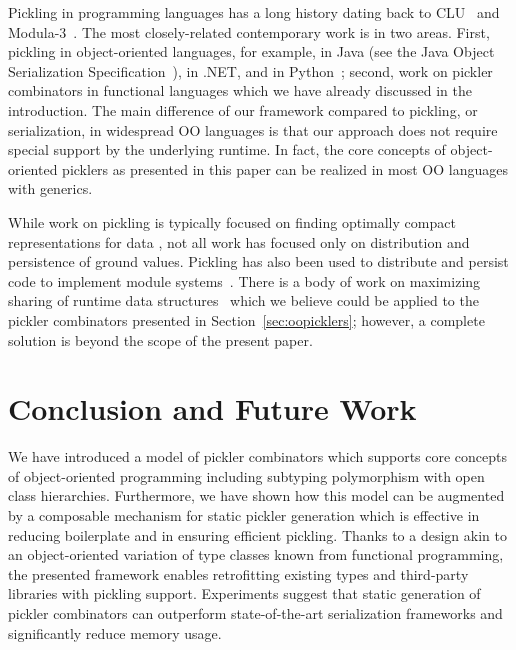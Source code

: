 \documentclass[preprint,10pt]{sigplanconf}
\theoremstyle{definition}
\theoremstyle{definition}
\begin{document}
Pickling in programming languages has a long history dating back to
CLU~\cite{HerlihyL82} and Modula-3~\cite{CardelliDJKN89}. The most
closely-related contemporary work is in two areas. First, pickling in
object-oriented languages, for example, in Java (see the Java Object
Serialization Specification~\cite{JavaSerialization}), in .NET, and in
Python~\cite{Rossum07}; second, work on pickler combinators in
functional languages which we have already discussed in the
introduction. The main difference of our framework compared to
pickling, or serialization, in widespread OO languages is that our
approach does not require special support by the underlying
runtime. In fact, the core concepts of object-oriented picklers as
presented in this paper can be realized in most OO languages with
generics.

While work on pickling is typically focused on finding optimally compact
representations for data \cite{EveryBitCounts}, not all work has focused only
on distribution and persistence of ground values. Pickling has also been
used to distribute and persist code to implement module systems~\cite{Roy99,Rossberg2007}.
There is a body of work on maximizing sharing of runtime data
structures~\cite{appel93hashconsing,Elsman2005,TackKS06} which we believe
could be applied to the pickler combinators presented in
Section~\ref{sec:oopicklers}; however, a complete solution is beyond the scope
of the present paper.



\section{Conclusion and Future Work}

We have introduced a model of pickler combinators which supports core
concepts of object-oriented programming including subtyping polymorphism
with open class hierarchies. Furthermore, we have shown how this model
can be augmented by a composable mechanism for static pickler
generation which is effective in reducing boilerplate and in ensuring
efficient pickling. Thanks to a design akin to an object-oriented
variation of type classes known from functional programming, the
presented framework enables retrofitting existing types and
third-party libraries with pickling support. Experiments suggest that
static generation of pickler combinators can outperform
state-of-the-art serialization frameworks and significantly reduce
memory usage.
\end{document}
